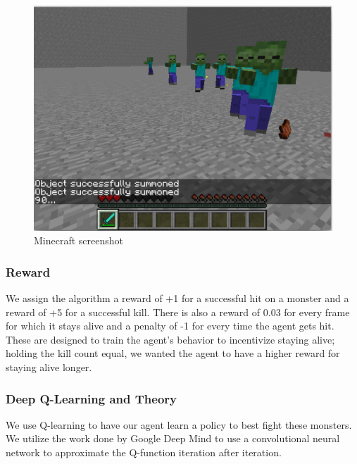 \documentclass{article}
\begin{document}
\begin{multicols}{2}
\begin{figure}[H]
\caption{Minecraft screenshot}
\centering
\includegraphics[scale=0.3]{./hiro_screenshot.png}
\end{figure}



\subsubsection{Reward}

We assign the algorithm a reward of +1 for a successful hit on a monster and a reward of +5 for a successful kill.
There is also a reward of 0.03 for every frame for which it stays alive and a penalty of -1 for every time the agent gets hit. These are designed to train the agent's behavior to incentivize staying alive; holding the kill count equal, we wanted the agent to have a higher reward for staying alive longer.



\subsubsection{Deep Q-Learning and Theory}

We use Q-learning to have our agent learn a policy to best fight these monsters.
We utilize the work done by Google Deep Mind to use a convolutional neural network to approximate the Q-function iteration after iteration.
\paragraph{}



\end{multicols}
\end{document}
